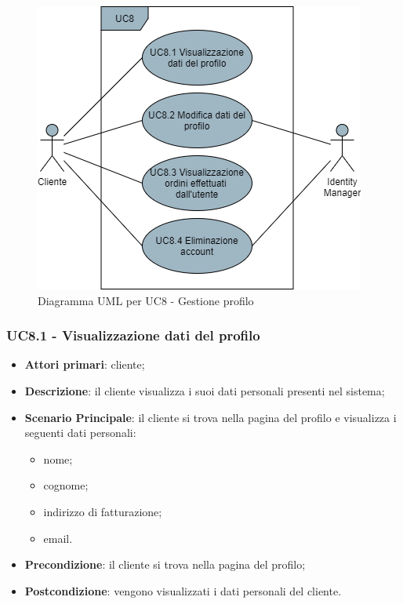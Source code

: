 \begin{figure}[H]
\centering
\includegraphics[scale=0.6]{res/UseCase/Immagini/GestioneProfilo}
\caption{Diagramma UML per UC8 - Gestione profilo}
\end{figure}

\subsubsection{UC8.1 - Visualizzazione dati del profilo}
\begin{itemize}
\item \textbf{Attori primari}: cliente;
\item \textbf{Descrizione}: il cliente visualizza i suoi dati personali presenti nel sistema;
\item \textbf{Scenario Principale}: il cliente si trova nella pagina del profilo e visualizza i seguenti dati personali:
\begin{itemize}
\item nome;
\item cognome;
\item indirizzo di fatturazione;
\item email.
\end{itemize}
\item \textbf{Precondizione}: il cliente si trova nella pagina del profilo;
\item \textbf{Postcondizione}: vengono visualizzati i dati personali del cliente.
\end{itemize}

